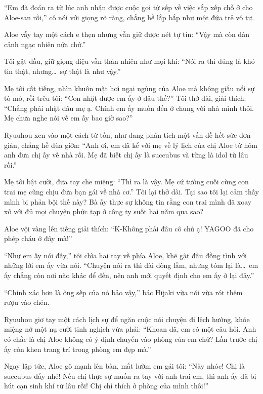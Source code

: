 \documentclass[../main.tex]{subfiles}
\begin{document}
``Em đã đoán ra từ lúc anh nhận được cuộc gọi từ sếp về việc sắp xếp chỗ ở cho Aloe-san rồi,'' cô nói với giọng rõ ràng, chẳng hề lắp bắp như một đứa trẻ vô tư.

Aloe vẫy tay một cách e thẹn nhưng vẫn giữ được nét tự tin: ``Vậy mà còn dàn cảnh ngạc nhiên nữa chứ.''

Tôi gật đầu, giữ giọng điệu vẫn thản nhiên như mọi khi: ``Nói ra thì đúng là khó tin thật, nhưng\dots\ sự thật là như vậy.''

Mẹ tôi cất tiếng, nhìn khuôn mặt hơi ngại ngùng của Aloe mà không giấu nổi sự tò mò, rồi trêu tôi: ``Con nhặt được em ấy ở đâu thế?'' Tôi thở dài, giải thích: ``Chẳng phải nhặt đâu mẹ ạ. Chính em ấy muốn đến ở chung với nhà mình thôi. Mẹ chưa nghe nói về em ấy bao giờ sao?''

Ryuuhou xen vào một cách từ tốn, như đang phân tích một vấn đề hết sức đơn giản, chẳng hề đùa giỡn: ``Anh ơi, em đã kể với mẹ về lý lịch của chị Aloe từ hôm anh đưa chị ấy về nhà rồi. Mẹ đã biết chị ấy là succubus và từng là idol từ lâu rồi.''

Mẹ tôi bật cười, đưa tay che miệng: ``Thì ra là vậy. Mẹ cứ tưởng cuối cùng con trai mẹ cũng chịu đưa bạn gái về nhà cơ.'' Tôi lại thở dài. Tại sao tôi lại cảm thấy mình bị phản bội thế này? Bà ấy thực sự không tin rằng con trai mình đã xoay xở với đủ mọi chuyện phức tạp ở công ty suốt hai năm qua sao?

Aloe vội vàng lên tiếng giải thích: ``K-Không phải đâu cô chú ạ! YAGOO đã cho phép cháu ở đây mà!''

``Như em ấy nói đấy,'' tôi chìa hai tay về phía Aloe, khẽ gật đầu đồng tình với những lời em ấy vừa nói. ``Chuyện nói ra thì dài dòng lắm, nhưng tóm lại là\dots\ em ấy chẳng còn nơi nào khác để đến, nên anh mới quyết định cho em ấy ở lại đây.''

``Chính xác hơn là ông sếp của nó bảo vậy,'' bác Hijaki vừa nói vừa rót thêm rượu vào chén.

Ryuuhou giơ tay một cách lịch sự để ngăn cuộc nói chuyện đi lệch hướng, khóe miệng nở một nụ cười tinh nghịch vừa phải: ``Khoan đã, em có một câu hỏi. Anh có chắc là chị Aloe không có ý định chuyển vào phòng của em chứ? Lần trước chị ấy còn khen trang trí trong phòng em đẹp mà.''

Ngay lập tức, Aloe gõ mạnh lên bàn, mắt lườm em gái tôi: ``Này nhóc! Chị là succubus đấy nhé! Nếu chị thực sự muốn ra tay với anh trai em, thì anh ấy đã bị hút cạn sinh khí từ lâu rồi! Chị chỉ thích ở phòng của mình thôi!''
\end{document}
